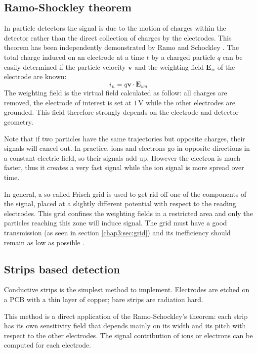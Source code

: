 \begin{refsection}
  \subsection{Ramo-Shockley theorem}
  \label{chap3:ramo}
  In particle detectors the signal is due to the motion of charges within the detector rather than the direct collection of charges by the electrodes. This theorem has been independently demonstrated by Ramo and Schockley \cite{Ramo_1939,Shockley_1938}. The total charge induced on an electrode at a time $t$ by a charged particle $q$ can be easily determined if the particle velocity $\boldsymbol{v}$ and the weighting field $\boldsymbol{E}_{w}$ of the electrode are known:
  \begin{equation}
    i_{n}= q\boldsymbol{v} \cdot \boldsymbol{E}_{wn}
  \end{equation}
  The weighting field is the virtual field calculated as follow: all charges are removed, the electrode of interest is set at $1\,\mathrm{V}$ while the other electrodes are grounded. This field therefore strongly depends on the electrode and detector geometry.

  Note that if two particles have the same trajectories but opposite charges, their signals will cancel out. In practice, ions and electrons go in opposite directions in a constant electric field, so their signals add up. However the electron is much faster, thus it creates a very fast signal while the ion signal is more spread over time.

  In general, a so-called Frisch grid is used to get rid off one of the components of the signal, placed at a slightly different potential with respect to the reading electrodes. This grid confines the weighting fields in a restricted area and only the particles reaching this zone will induce signal. The grid must have a good transmission (as seen in section \ref{chap3:sec:grid}) and its inefficiency should remain as low as possible \cite{Khriachkov1997,Gook2012}.

  \subsection{Strips based detection}
  Conductive strips is the simplest method to implement. Electrodes are etched on a PCB with a thin layer of copper; bare strips are radiation hard.

  This method is a direct application of the Ramo-Schockley's theorem: each strip has its own sensitivity field that depends mainly on its width and its pitch with respect to the other electrodes. The signal contribution of ions or electrons can be computed for each electrode.


\end{refsection}
